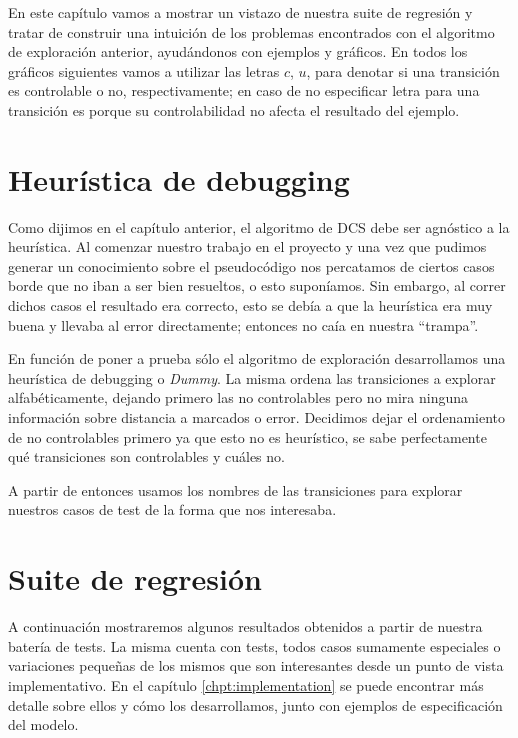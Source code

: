 En este capítulo vamos a mostrar un vistazo de nuestra suite de regresión y tratar de construir una intuición de los problemas encontrados con el algoritmo de exploración anterior, ayudándonos con ejemplos y gráficos. En todos los gráficos siguientes vamos a utilizar las letras $c$, $u$, para denotar si una transición es controlable o no, respectivamente; en caso de no especificar letra para una transición es porque su controlabilidad no afecta el resultado del ejemplo.

\section{Heurística de debugging}
Como dijimos en el capítulo anterior, el algoritmo de DCS debe ser agnóstico a la heurística. Al comenzar nuestro trabajo en el proyecto y una vez que pudimos generar un conocimiento sobre el pseudocódigo nos percatamos de ciertos casos borde que no iban a ser bien resueltos, o esto suponíamos. Sin embargo, al correr dichos casos el resultado era correcto, esto se debía a que la heurística era muy buena y llevaba al error directamente; entonces no caía en nuestra ``trampa''.

En función de poner a prueba sólo el algoritmo de exploración desarrollamos una heurística de debugging o \textit{Dummy}. La misma ordena las transiciones a explorar alfabéticamente, dejando primero las no controlables pero no mira ninguna información sobre distancia a marcados o error. Decidimos dejar el ordenamiento de no controlables primero ya que esto no es heurístico, se sabe perfectamente qué transiciones son controlables y cuáles no.

A partir de entonces usamos los nombres de las transiciones para explorar nuestros casos de test de la forma que nos interesaba. 

\section{Suite de regresión}
A continuación mostraremos algunos resultados obtenidos a partir de nuestra batería de tests. La misma cuenta con \totalTests tests, todos casos sumamente especiales o variaciones pequeñas de los mismos que son interesantes desde un punto de vista implementativo. En el capítulo \ref{chpt:implementation} se puede encontrar más detalle sobre ellos y cómo los desarrollamos, junto con ejemplos de especificación del modelo.

